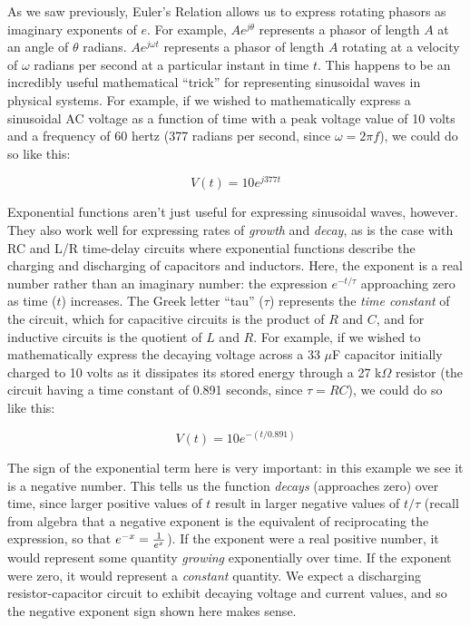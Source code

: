 As we saw previously, Euler's Relation allows us to express rotating phasors as imaginary exponents of $e$.  For example, $Ae^{j \theta}$ represents a phasor of length $A$ at an angle of $\theta$ radians.  $Ae^{j \omega t}$ represents a phasor of length $A$ rotating at a velocity of $\omega$ radians per second at a particular instant in time $t$.  This happens to be an incredibly useful mathematical ``trick'' for representing sinusoidal waves in physical systems.  For example, if we wished to mathematically express a sinusoidal AC voltage as a function of time with a peak voltage value of 10 volts and a frequency of 60 hertz (377 radians per second, since $\omega = 2 \pi f$), we could do so like this:

$$V(t) = 10 e^{j377t}$$ 

Exponential functions aren't just useful for expressing sinusoidal waves, however.  They also work well for expressing rates of \textit{growth} and \textit{decay}, as is the case with RC and L/R time-delay circuits where exponential functions describe the charging and discharging of capacitors and inductors.  Here, the exponent is a real number rather than an imaginary number: the expression $e^{-t / \tau}$ approaching zero as time ($t$) increases.  The Greek letter ``tau'' ($\tau$) represents the \textit{time constant} of the circuit, which for capacitive circuits is the product of $R$ and $C$, and for inductive circuits is the quotient of $L$ and $R$.  For example, if we wished to mathematically express the decaying voltage across a 33 $\mu$F capacitor initially charged to 10 volts as it dissipates its stored energy through a 27 k$\Omega$ resistor (the circuit having a time constant of 0.891 seconds, since $\tau = RC$), we could do so like this:

$$V(t) = 10 e^{-(t / 0.891)}$$ 

The sign of the exponential term here is very important: in this example we see it is a negative number.  This tells us the function \textit{decays} (approaches zero) over time, since larger positive values of $t$ result in larger negative values of $t / \tau$ (recall from algebra that a negative exponent is the equivalent of reciprocating the expression, so that $e^{-x} = {1 \over {e^x}}$).  If the exponent were a real positive number, it would represent some quantity \textit{growing} exponentially over time.  If the exponent were zero, it would represent a \textit{constant} quantity.  We expect a discharging resistor-capacitor circuit to exhibit decaying voltage and current values, and so the negative exponent sign shown here makes sense.

